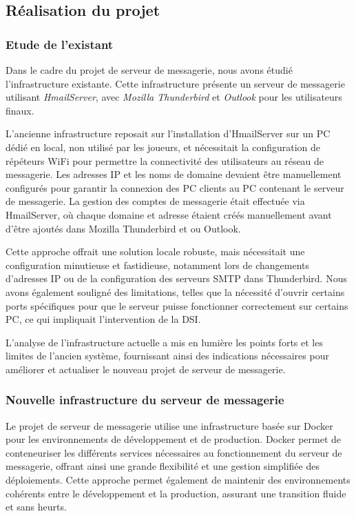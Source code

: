 \subsection{Réalisation du projet}

\subsubsection{Etude de l'existant}

Dans le cadre du projet de serveur de messagerie, nous avons étudié l'infrastructure existante.
Cette infrastructure présente un serveur de messagerie utilisant \textit{HmailServer}, avec \textit{Mozilla Thunderbird} et \textit{Outlook} pour les utilisateurs finaux.

L'ancienne infrastructure reposait sur l'installation d'HmailServer sur un PC dédié en local, non utilisé par les joueurs, et nécessitait la configuration de répéteurs WiFi pour permettre la connectivité des utilisateurs au réseau de messagerie.
Les adresses IP et les noms de domaine devaient être manuellement configurés pour garantir la connexion des PC clients au PC contenant le serveur de messagerie.
La gestion des comptes de messagerie était effectuée via HmailServer, où chaque domaine et adresse étaient créés manuellement avant d'être ajoutés dans Mozilla Thunderbird et ou Outlook.

Cette approche offrait une solution locale robuste, mais nécessitait une configuration minutieuse et fastidieuse, notamment lors de changements d'adresses IP ou de la configuration des serveurs SMTP dans Thunderbird.
Nous avons également souligné des limitations, telles que la nécessité d'ouvrir certains ports spécifiques pour que le serveur puisse fonctionner correctement sur certains PC, ce qui impliquait l'intervention de la DSI.

L’analyse de l'infrastructure actuelle a mis en lumière les points forts et les limites de l’ancien système, fournissant ainsi des indications nécessaires pour améliorer et actualiser le nouveau projet de serveur de messagerie.


\subsubsection{Nouvelle infrastructure du serveur de messagerie}

Le projet de serveur de messagerie utilise une infrastructure basée sur Docker pour les environnements de développement et de production. Docker permet de conteneuriser les différents services nécessaires au fonctionnement du serveur de messagerie, offrant ainsi une grande flexibilité et une gestion simplifiée des déploiements.
Cette approche permet également de maintenir des environnements cohérents entre le développement et la production, assurant une transition fluide et sans heurts.


